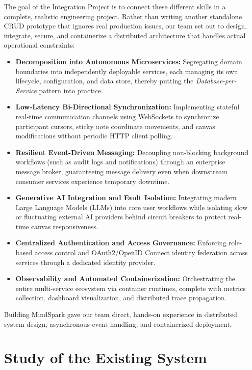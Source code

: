 The goal of the Integration Project is to connect these different skills in a complete, realistic engineering project. Rather than writing another standalone CRUD prototype that ignores real production issues, our team set out to design, integrate, secure, and containerize a distributed architecture that handles actual operational constraints:

\begin{itemize}[leftmargin=1.5em]
    \item \textbf{Decomposition into Autonomous Microservices:} Segregating domain boundaries into independently deployable services, each managing its own lifecycle, configuration, and data store, thereby putting the \textit{Database-per-Service} pattern into practice.
    \item \textbf{Low-Latency Bi-Directional Synchronization:} Implementing stateful real-time communication channels using WebSockets to synchronize participant cursors, sticky note coordinate movements, and canvas modifications without periodic HTTP client polling.
    \item \textbf{Resilient Event-Driven Messaging:} Decoupling non-blocking background workflows (such as audit logs and notifications) through an enterprise message broker, guaranteeing message delivery even when downstream consumer services experience temporary downtime.
    \item \textbf{Generative AI Integration and Fault Isolation:} Integrating modern Large Language Models (LLMs) into core user workflows while isolating slow or fluctuating external AI providers behind circuit breakers to protect real-time canvas responsiveness.
    \item \textbf{Centralized Authentication and Access Governance:} Enforcing role-based access control and OAuth2/OpenID Connect identity federation across services through a dedicated identity provider.
    \item \textbf{Observability and Automated Containerization:} Orchestrating the entire multi-service ecosystem via container runtimes, complete with metrics collection, dashboard visualization, and distributed trace propagation.
\end{itemize}

Building MindSpark gave our team direct, hands-on experience in distributed system design, asynchronous event handling, and containerized deployment.

\section{Study of the Existing System}
\label{sec:existing_system}

